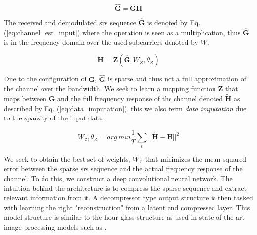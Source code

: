 \begin{equation}\label{eq:channel_est_input}
    \mathbf{\hat{G}} = \mathbf{G} \mathbf{H}
\end{equation}

The received and demodulated \gls{srs} sequence $\mathbf{\hat{G}}$ is denoted by Eq. (\ref{eq:channel_est_input}) where the operation is seen as a multiplication, thus $\mathbf{\hat{G}}$ is in the frequency domain over the used subcarriers denoted by $W$.

\begin{equation}\label{eq:data_imputation}
    \mathbf{\widetilde{H}} =   \mathbf{Z}(\mathbf{\hat{G}},W_Z, \theta_Z)
\end{equation}


Due to the configuration of $\mathbf{G}$, $\mathbf{\hat{G}}$ is sparse and thus not a full approximation of the channel over the bandwidth. We seek to learn a mapping function $\mathbf{Z}$ that maps between $\mathbf{\hat{G}}$ and the full frequency response of the channel denoted $\mathbf{\tilde{H}}$ as described by Eq. (\ref{eq:data_imputation}), this we also term \emph{data imputation} due to the sparsity of the input data.


\begin{equation}\label{eq:loss_function_channel_est}
    W_Z, \theta_Z = {arg\,min} \frac{1}{T}\sum_t || \mathbf{\widetilde{H}} - \mathbf{H}|| ^2
\end{equation}

We seek to obtain the best set of weights, $W_Z$ that minimizes the mean squared error between the sparse \gls{srs} sequence and the actual frequency response of the channel. To do this, we construct a deep convolutional neural network. The intuition behind the architecture is to compress the sparse sequence and extract relevant information from it. A decompressor type output structure is then tasked with learning the right "reconstruction" from a latent and compressed layer. This model structure is similar to the hour-glass structure as used in state-of-the-art image processing models such as \cite{DeepPrior}. 

